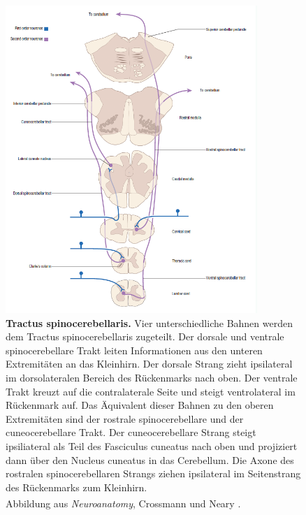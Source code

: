 \begin{figure}[H]
    \centering
    \includegraphics[width=0.85\textwidth]{pictures/Bilder_Laura/spinocerebellar_tract.PNG}
    \caption[Tractus spinocerebellaris]{\textbf{Tractus spinocerebellaris.} Vier unterschiedliche Bahnen werden dem Tractus spinocerebellaris zugeteilt. Der dorsale und ventrale spinocerebellare Trakt leiten Informationen aus den unteren Extremitäten an das Kleinhirn. Der dorsale Strang zieht ipsilateral im dorsolateralen Bereich des Rückenmarks nach oben. Der ventrale Trakt kreuzt auf die contralaterale Seite und steigt ventrolateral im Rückenmark auf. Das Äquivalent dieser Bahnen zu den oberen Extremitäten sind der rostrale spinocerebellare und der cuneocerebellare Trakt. Der cuneocerebellare Strang steigt ipsiliateral als Teil des Fasciculus cuneatus nach oben und projiziert dann über den Nucleus cuneatus in das Cerebellum. Die Axone des rostralen spinocerebellaren Strangs ziehen ipsilateral im Seitenstrang des Rückenmarks zum Kleinhirn. \\
    Abbildung aus \textit{Neuroanatomy}, Crossmann und Neary \textsuperscript{\cite[8]{crossman2014neuroanatomy}}.}
    \label{fig:tr_spinocerebellaris}
\end{figure}

